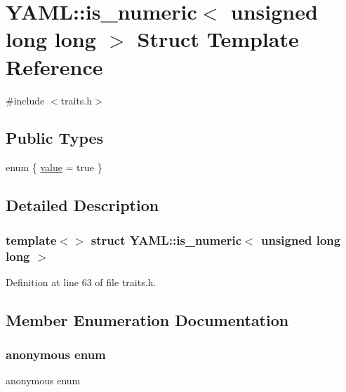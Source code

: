 \hypertarget{struct_y_a_m_l_1_1is__numeric_3_01unsigned_01long_01long_01_4}{}\section{Y\+A\+ML\+::is\+\_\+numeric$<$ unsigned long long $>$ Struct Template Reference}
\label{struct_y_a_m_l_1_1is__numeric_3_01unsigned_01long_01long_01_4}


{\ttfamily \#include $<$traits.\+h$>$}

\subsection*{Public Types}
\begin{DoxyCompactItemize}
\item 
enum \{ \mbox{\hyperlink{struct_y_a_m_l_1_1is__numeric_3_01unsigned_01long_01long_01_4_a06d934941bde954a8e4a73966195692aa8712886e1f4b535c8f4d37b136cf6298}{value}} = true
 \}
\end{DoxyCompactItemize}


\subsection{Detailed Description}
\subsubsection*{template$<$$>$\newline
struct Y\+A\+M\+L\+::is\+\_\+numeric$<$ unsigned long long $>$}



Definition at line 63 of file traits.\+h.



\subsection{Member Enumeration Documentation}
\mbox{\label{struct_y_a_m_l_1_1is__numeric_3_01unsigned_01long_01long_01_4_a06d934941bde954a8e4a73966195692a}} 
\subsubsection{\texorpdfstring{anonymous enum}{anonymous enum}}
{\footnotesize\ttfamily anonymous enum}

